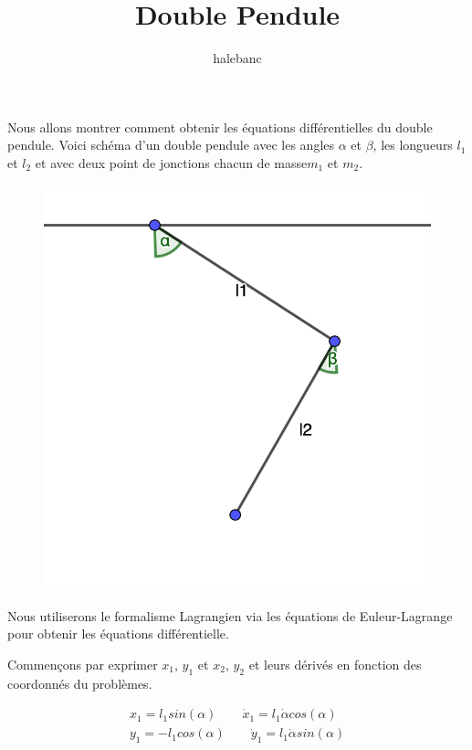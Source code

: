 \documentclass{article}
\title{Double Pendule}
\author{halebanc}
\date{}
\begin{document}
\maketitle

Nous allons montrer comment obtenir les équations différentielles du double pendule.
Voici schéma d'un double pendule avec les angles $\alpha$ et $\beta$, les longueurs $l_1$ et $l_2$ et avec deux point de jonctions chacun de masse$m_1$ et $m_2$.
\begin{figure}[!ht]
    \center
    \includegraphics[scale=0.5]{double_pendule.png}
\end{figure}

Nous utiliserons le formalisme Lagrangien via les équations de Euleur-Lagrange pour obtenir les équations différentielle. 

Commençons par exprimer $x_1$, $y_1$ et $x_2$, $y_2$ et leurs dérivés en fonction des coordonnés du problèmes.

\begin{align*}
    x_1=l_1 sin(\alpha) \quad \quad
    \dot{x}_1=l_1 \dot{\alpha} cos(\alpha)
    \\
    y_1=-l_1 cos(\alpha) \quad \quad
    \dot{y}_1=l_1 \dot{\alpha} sin(\alpha)
\end{align*}
\end{document}
